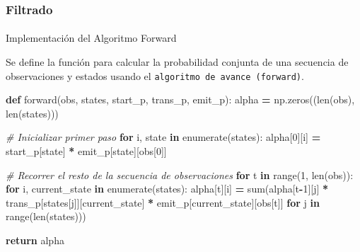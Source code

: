 \documentclass[
  a4paper,
  DIV=11,
  numbers=noendperiod]{scrreprt}
\makeatletter
\let\oldparagraph\paragraph
\renewcommand{\paragraph}{
    \@ifstar
      \xxxParagraphStar
      \xxxParagraphNoStar
  }
\newcommand{\xxxParagraphStar}[1]{\oldparagraph*{#1}\mbox{}}
\newcommand{\xxxParagraphNoStar}[1]{\oldparagraph{#1}\mbox{}}
\newenvironment{Shaded}{\begin{snugshade}}{\end{snugshade}}
\newcommand{\BuiltInTok}[1]{#1}
\newcommand{\CommentTok}[1]{\textcolor[rgb]{0.56,0.35,0.01}{\textit{#1}}}
\newcommand{\ControlFlowTok}[1]{\textcolor[rgb]{0.13,0.29,0.53}{\textbf{#1}}}
\newcommand{\DecValTok}[1]{\textcolor[rgb]{0.00,0.00,0.81}{#1}}
\newcommand{\KeywordTok}[1]{\textcolor[rgb]{0.13,0.29,0.53}{\textbf{#1}}}
\newcommand{\NormalTok}[1]{#1}
\newcommand{\OperatorTok}[1]{\textcolor[rgb]{0.81,0.36,0.00}{\textbf{#1}}}
\makeatother
\begin{document}
\subsubsection{Filtrado}\label{filtrado}

\paragraph{Implementación del Algoritmo
Forward}\label{implementaciuxf3n-del-algoritmo-forward}

Se define la función para calcular la probabilidad conjunta de una
secuencia de observaciones y estados usando el
\texttt{algoritmo\ de\ avance\ (forward)}.

\begin{Shaded}
\begin{Highlighting}[numbers=left,,]
\KeywordTok{def}\NormalTok{ forward(obs, states, start\_p, trans\_p, emit\_p):}
\NormalTok{    alpha }\OperatorTok{=}\NormalTok{ np.zeros((}\BuiltInTok{len}\NormalTok{(obs), }\BuiltInTok{len}\NormalTok{(states)))}

    \CommentTok{\# Inicializar primer paso}
    \ControlFlowTok{for}\NormalTok{ i, state }\KeywordTok{in} \BuiltInTok{enumerate}\NormalTok{(states):}
\NormalTok{        alpha[}\DecValTok{0}\NormalTok{][i] }\OperatorTok{=}\NormalTok{ start\_p[state] }\OperatorTok{*}\NormalTok{ emit\_p[state][obs[}\DecValTok{0}\NormalTok{]]}

    \CommentTok{\# Recorrer el resto de la secuencia de observaciones}
    \ControlFlowTok{for}\NormalTok{ t }\KeywordTok{in} \BuiltInTok{range}\NormalTok{(}\DecValTok{1}\NormalTok{, }\BuiltInTok{len}\NormalTok{(obs)):}
        \ControlFlowTok{for}\NormalTok{ i, current\_state }\KeywordTok{in} \BuiltInTok{enumerate}\NormalTok{(states):}
\NormalTok{            alpha[t][i] }\OperatorTok{=} \BuiltInTok{sum}\NormalTok{(alpha[t}\OperatorTok{{-}}\DecValTok{1}\NormalTok{][j] }\OperatorTok{*}\NormalTok{ trans\_p[states[j]][current\_state] }\OperatorTok{*}\NormalTok{ emit\_p[current\_state][obs[t]] }\ControlFlowTok{for}\NormalTok{ j }\KeywordTok{in} \BuiltInTok{range}\NormalTok{(}\BuiltInTok{len}\NormalTok{(states)))}

    \ControlFlowTok{return}\NormalTok{ alpha}
\end{Highlighting}
\end{Shaded}
\end{document}
